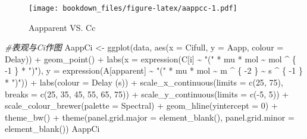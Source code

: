 \documentclass[
]{krantz}
\makeatletter
\newenvironment{Shaded}{\begin{snugshade}}{\end{snugshade}}
\newcommand{\AttributeTok}[1]{\textcolor[rgb]{0.77,0.63,0.00}{#1}}
\newcommand{\CommentTok}[1]{\textcolor[rgb]{0.56,0.35,0.01}{\textit{#1}}}
\newcommand{\DecValTok}[1]{\textcolor[rgb]{0.00,0.00,0.81}{#1}}
\newcommand{\FunctionTok}[1]{\textcolor[rgb]{0.00,0.00,0.00}{#1}}
\newcommand{\NormalTok}[1]{#1}
\newcommand{\OtherTok}[1]{\textcolor[rgb]{0.56,0.35,0.01}{#1}}
\newcommand{\SpecialCharTok}[1]{\textcolor[rgb]{0.00,0.00,0.00}{#1}}
\newcommand{\StringTok}[1]{\textcolor[rgb]{0.31,0.60,0.02}{#1}}
\newenvironment{kframe}{%
\medskip{}
\setlength{\fboxsep}{.8em}
 \def\at@end@of@kframe{}%
 \ifinner\ifhmode%
  \def\at@end@of@kframe{\end{minipage}}%
  \begin{minipage}{\columnwidth}%
 \fi\fi%
 \def\FrameCommand##1{\hskip\@totalleftmargin \hskip-\fboxsep
 \colorbox{shadecolor}{##1}\hskip-\fboxsep
     \hskip-\linewidth \hskip-\@totalleftmargin \hskip\columnwidth}%
 \MakeFramed {\advance\hsize-\width
   \@totalleftmargin\z@ \linewidth\hsize
   \@setminipage}}%
 {\par\unskip\endMakeFramed%
 \at@end@of@kframe}
\renewenvironment{Shaded}{\begin{kframe}}{\end{kframe}}
\makeatother
\begin{document}
\begin{figure}
\centering
\texttt{[image: bookdown\_files/figure-latex/aappcc-1.pdf]}
\caption{\label{fig:aappcc}Aapparent VS. Cc}
\end{figure}

\begin{Shaded}
\begin{Highlighting}[]
\CommentTok{\#表观与Ci作图}
\NormalTok{AappCi }\OtherTok{\textless{}{-}} \FunctionTok{ggplot}\NormalTok{(data, }\FunctionTok{aes}\NormalTok{(}\AttributeTok{x =}\NormalTok{ Cifull, }\AttributeTok{y =}\NormalTok{ Aapp, }\AttributeTok{colour =}\NormalTok{ Delay)) }\SpecialCharTok{+}
  \FunctionTok{geom\_point}\NormalTok{() }\SpecialCharTok{+}
  \FunctionTok{labs}\NormalTok{(}\AttributeTok{x =} \FunctionTok{expression}\NormalTok{(C[i] }\SpecialCharTok{\textasciitilde{}} \StringTok{"("} \SpecialCharTok{*}\NormalTok{ mu }\SpecialCharTok{*}\NormalTok{ mol }\SpecialCharTok{\textasciitilde{}}\NormalTok{ mol }\SpecialCharTok{\^{}}\NormalTok{ \{}
    \SpecialCharTok{{-}}\DecValTok{1}
\NormalTok{  \} }\SpecialCharTok{*} \StringTok{")"}\NormalTok{),}
  \AttributeTok{y =} \FunctionTok{expression}\NormalTok{(A[apparent] }\SpecialCharTok{\textasciitilde{}} \StringTok{"("} \SpecialCharTok{*}\NormalTok{ mu }\SpecialCharTok{*}\NormalTok{ mol }\SpecialCharTok{\textasciitilde{}}\NormalTok{ m }\SpecialCharTok{\^{}}\NormalTok{ \{}
    \SpecialCharTok{{-}}\DecValTok{2}
\NormalTok{  \} }\SpecialCharTok{\textasciitilde{}}\NormalTok{ s }\SpecialCharTok{\^{}}\NormalTok{ \{}
    \SpecialCharTok{{-}}\DecValTok{1}
\NormalTok{  \} }\SpecialCharTok{*} \StringTok{")"}\NormalTok{)) }\SpecialCharTok{+}
  \FunctionTok{labs}\NormalTok{(}\AttributeTok{colour =} \StringTok{\textquotesingle{}Delay (s)\textquotesingle{}}\NormalTok{) }\SpecialCharTok{+}
  \FunctionTok{scale\_x\_continuous}\NormalTok{(}\AttributeTok{limits =} \FunctionTok{c}\NormalTok{(}\DecValTok{25}\NormalTok{, }\DecValTok{75}\NormalTok{),}
                     \AttributeTok{breaks =} \FunctionTok{c}\NormalTok{(}\DecValTok{25}\NormalTok{, }\DecValTok{35}\NormalTok{, }\DecValTok{45}\NormalTok{, }\DecValTok{55}\NormalTok{, }\DecValTok{65}\NormalTok{, }\DecValTok{75}\NormalTok{)) }\SpecialCharTok{+}
  \FunctionTok{scale\_y\_continuous}\NormalTok{(}\AttributeTok{limits =} \FunctionTok{c}\NormalTok{(}\SpecialCharTok{{-}}\DecValTok{5}\NormalTok{, }\DecValTok{5}\NormalTok{)) }\SpecialCharTok{+}
  \FunctionTok{scale\_colour\_brewer}\NormalTok{(}\AttributeTok{palette =} \StringTok{\textquotesingle{}Spectral\textquotesingle{}}\NormalTok{) }\SpecialCharTok{+}
  \FunctionTok{geom\_hline}\NormalTok{(}\AttributeTok{yintercept =} \DecValTok{0}\NormalTok{) }\SpecialCharTok{+}
  \FunctionTok{theme\_bw}\NormalTok{() }\SpecialCharTok{+}
  \FunctionTok{theme}\NormalTok{(}\AttributeTok{panel.grid.major =} \FunctionTok{element\_blank}\NormalTok{(),}
        \AttributeTok{panel.grid.minor =} \FunctionTok{element\_blank}\NormalTok{())}
\NormalTok{AappCi}
\end{Highlighting}
\end{Shaded}
\end{document}
